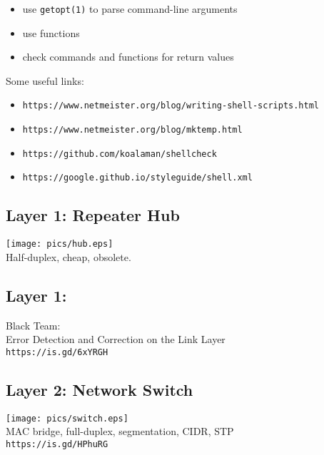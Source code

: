 \documentclass[xga]{xdvislides}
\begin{document}
\begin{itemize}
	\item use \verb+getopt(1)+ to parse command-line arguments
	\item use functions
	\item check commands and functions for return values 
\end{itemize}
\vspace{.5in}

Some useful links:
\begin{itemize}
	\item \verb+https://www.netmeister.org/blog/writing-shell-scripts.html+
	\item \verb+https://www.netmeister.org/blog/mktemp.html+
	\item \verb+https://github.com/koalaman/shellcheck+
	\item \verb+https://google.github.io/styleguide/shell.xml+
\end{itemize}


\subsection{Layer 1: Repeater Hub}
\vspace*{\fill}
\begin{center}
	\texttt{[image: pics/hub.eps]} \\
	Half-duplex, cheap, obsolete.
\end{center}
\vspace*{\fill}

\subsection{Layer 1:}
Black Team: \\

Error Detection and Correction on the Link Layer \\
\verb+https://is.gd/6xYRGH+

\subsection{Layer 2: Network Switch}
\vspace*{\fill}
\begin{center}
	\texttt{[image: pics/switch.eps]} \\
	MAC bridge, full-duplex, segmentation, CIDR, STP \\
	\verb+https://is.gd/HPhuRG+
\end{center}
\vspace*{\fill}
\end{document}
